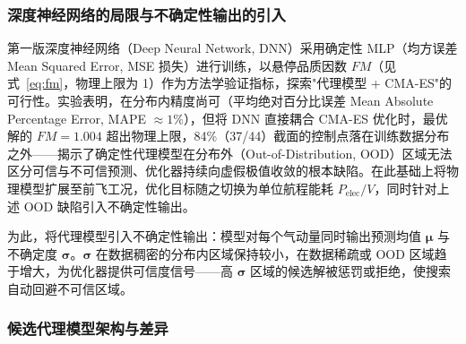 \subsubsection{深度神经网络的局限与不确定性输出的引入}
\label{sec:dnn_limit}

第一版深度神经网络（Deep Neural Network, DNN）采用确定性 MLP（均方误差 Mean Squared Error, MSE 损失）进行训练，以悬停品质因数 $FM$（见式~\ref{eq:fm}，物理上限为 1）作为方法学验证指标，探索"代理模型 + CMA-ES"的可行性。实验表明，在分布内精度尚可（平均绝对百分比误差 Mean Absolute Percentage Error, MAPE $\approx 1\%$），但将 DNN 直接耦合 CMA-ES 优化时，最优解的 $FM = 1.004$ 超出物理上限，84\%（37/44）截面的控制点落在训练数据分布之外——揭示了确定性代理模型在分布外（Out-of-Distribution, OOD）区域无法区分可信与不可信预测、优化器持续向虚假极值收敛的根本缺陷。在此基础上将物理模型扩展至前飞工况，优化目标随之切换为单位航程能耗 $P_\text{elec}/V$，同时针对上述 OOD 缺陷引入不确定性输出。

为此，将代理模型引入不确定性输出：模型对每个气动量同时输出预测均值 $\bm{\mu}$ 与不确定度 $\bm{\sigma}$。$\bm{\sigma}$ 在数据稠密的分布内区域保持较小，在数据稀疏或 OOD 区域趋于增大，为优化器提供可信度信号——高 $\bm{\sigma}$ 区域的候选解被惩罚或拒绝，使搜索自动回避不可信区域。

\subsubsection{候选代理模型架构与差异}


